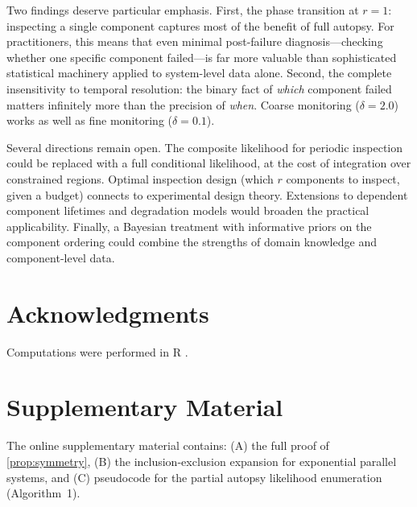 \documentclass[12pt]{article}
\begin{document}
Two findings deserve particular emphasis.  First, the phase transition at
$r = 1$: inspecting a single component captures most of the benefit of
full autopsy.  For practitioners, this means that even minimal post-failure
diagnosis---checking whether one specific component failed---is far more
valuable than sophisticated statistical machinery applied to system-level
data alone.  Second, the complete insensitivity to temporal resolution:
the binary fact of \emph{which} component failed matters infinitely more
than the precision of \emph{when}.  Coarse monitoring ($\delta = 2.0$)
works as well as fine monitoring ($\delta = 0.1$).

Several directions remain open.  The composite likelihood for periodic
inspection could be replaced with a full conditional likelihood, at the
cost of integration over constrained regions.  Optimal inspection design
(which $r$ components to inspect, given a budget) connects to experimental
design theory.  Extensions to dependent component lifetimes and degradation
models would broaden the practical applicability.  Finally, a Bayesian
treatment with informative priors on the component ordering could combine
the strengths of domain knowledge and component-level data.


\section*{Acknowledgments}

Computations were performed in R \citep{RCore2025}.


\section*{Supplementary Material}

The online supplementary material contains: (A) the full proof of
\cref{prop:symmetry}, (B) the inclusion-exclusion expansion for
exponential parallel systems, and (C) pseudocode for the partial
autopsy likelihood enumeration (Algorithm~1).




\end{document}
